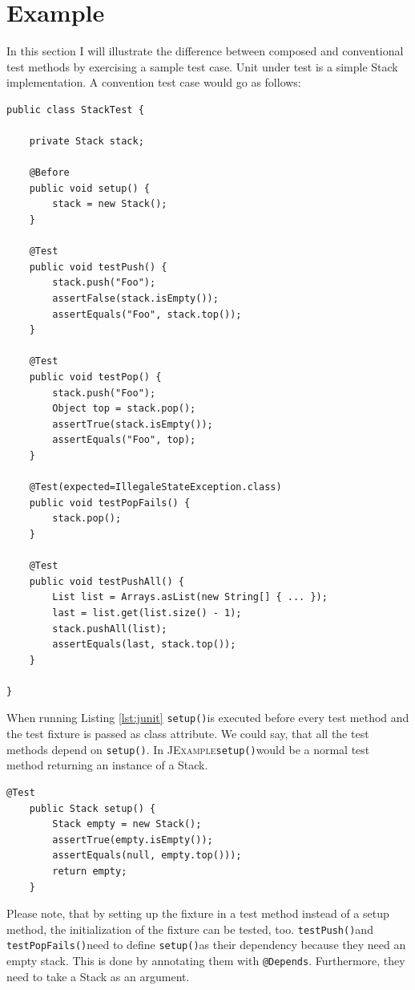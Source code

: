 \documentclass[11pt]{article}
\newcommand{\JUnit}{\textsc{JUnit}\xspace}
\newcommand{\JExample}{\textsc{JExample}\xspace}
\newcommand{\ttt}[1]{\texttt{#1}}
\newcommand{\setup}{\ttt{setup()}}
\newcommand{\testPush}{\ttt{testPush()}}
\newcommand{\testPopFails}{\ttt{testPopFails()}}
\begin{document}
\section{Example}

\lstset{language=Java}

In this section I will illustrate the difference between composed and conventional test methods by exercising a sample test case. Unit under test is a simple Stack implementation. A convention test case would go as follows:

\begin{lstlisting}[label=lst:junit,caption=Conventional \JUnit test case.]
public class StackTest {

    private Stack stack;

    @Before
    public void setup() {
        stack = new Stack();
    }

    @Test
    public void testPush() {
        stack.push("Foo");
        assertFalse(stack.isEmpty());
        assertEquals("Foo", stack.top());
    }

    @Test
    public void testPop() {
        stack.push("Foo");
        Object top = stack.pop();
        assertTrue(stack.isEmpty());
        assertEquals("Foo", top);
    }

    @Test(expected=IllegaleStateException.class)
    public void testPopFails() {
        stack.pop();
    }

    @Test
    public void testPushAll() {
        List list = Arrays.asList(new String[] { ... });
        last = list.get(list.size() - 1);
        stack.pushAll(list);
        assertEquals(last, stack.top());
    }

}
\end{lstlisting}

When running Listing \ref{lst:junit} \setup is executed before every test method and the test fixture is passed as class attribute. We could say, that all the test methods depend on \setup. In \JExample \setup would be a normal test method returning an instance of a Stack.

\begin{lstlisting}[label=lst:setup,caption=Promote fixture to test with return value.]
    @Test
    public Stack setup() {
        Stack empty = new Stack();
        assertTrue(empty.isEmpty());
        assertEquals(null, empty.top()));
        return empty;
    }
\end{lstlisting}

Please note, that by setting up the fixture in a test method instead of a setup method, the initialization of the fixture can be tested, too.
\testPush and \testPopFails need to define \setup as their dependency because they need an empty stack. This is done by annotating them with \ttt{@Depends}. Furthermore, they need to take a Stack as an argument.
\end{document}
